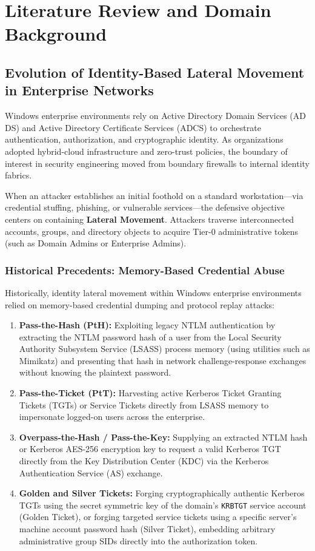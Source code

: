 \chapter{Literature Review and Domain Background}
\label{ch:background}

\section{Evolution of Identity-Based Lateral Movement in Enterprise Networks}
Windows enterprise environments rely on Active Directory Domain Services (AD DS) and Active Directory Certificate Services (ADCS) to orchestrate authentication, authorization, and cryptographic identity. As organizations adopted hybrid-cloud infrastructure and zero-trust policies, the boundary of interest in security engineering moved from boundary firewalls to internal identity fabrics.

When an attacker establishes an initial foothold on a standard workstation—via credential stuffing, phishing, or vulnerable services—the defensive objective centers on containing \textbf{Lateral Movement}. Attackers traverse interconnected accounts, groups, and directory objects to acquire Tier-0 administrative tokens (such as Domain Admins or Enterprise Admins).

\subsection{Historical Precedents: Memory-Based Credential Abuse}
Historically, identity lateral movement within Windows enterprise environments relied on memory-based credential dumping and protocol replay attacks:
\begin{enumerate}
    \item \textbf{Pass-the-Hash (PtH):} Exploiting legacy NTLM authentication by extracting the NTLM password hash of a user from the Local Security Authority Subsystem Service (LSASS) process memory (using utilities such as Mimikatz) and presenting that hash in network challenge-response exchanges without knowing the plaintext password.
    \item \textbf{Pass-the-Ticket (PtT):} Harvesting active Kerberos Ticket Granting Tickets (TGTs) or Service Tickets directly from LSASS memory to impersonate logged-on users across the enterprise.
    \item \textbf{Overpass-the-Hash / Pass-the-Key:} Supplying an extracted NTLM hash or Kerberos AES-256 encryption key to request a valid Kerberos TGT directly from the Key Distribution Center (KDC) via the Kerberos Authentication Service (AS) exchange.
    \item \textbf{Golden and Silver Tickets:} Forging cryptographically authentic Kerberos TGTs using the secret symmetric key of the domain's \texttt{KRBTGT} service account (Golden Ticket), or forging targeted service tickets using a specific server's machine account password hash (Silver Ticket), embedding arbitrary administrative group SIDs directly into the authorization token.
\end{enumerate}

